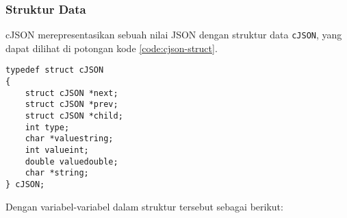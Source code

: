 \subsubsection{Struktur Data}
\label{sec:cmodules-cJSON-datastruct}

cJSON merepresentasikan sebuah nilai JSON dengan struktur data \verb|cJSON|, yang dapat dilihat di potongan kode \ref{code:cjson-struct}.

\begin{lstlisting}[caption=Struktur data cJSON, label=code:cjson-struct]
typedef struct cJSON
{
    struct cJSON *next;
    struct cJSON *prev;
    struct cJSON *child;
    int type;
    char *valuestring;
    int valueint;
    double valuedouble;
    char *string;
} cJSON;
\end{lstlisting}
\noindent
Dengan variabel-variabel dalam struktur tersebut sebagai berikut:

